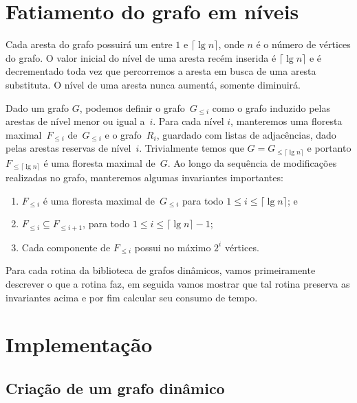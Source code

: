 \section{Fatiamento do grafo em níveis}
\label{sec:fatia-em-niveis}
Cada aresta do grafo possuirá um  entre $1$ e $\lceil \lg n \rceil$, onde $n$ é o número de vértices do grafo. O valor inicial do nível de uma aresta recém inserida é $\lceil \lg n \rceil$ e é decrementado toda vez que percorremos a aresta em busca de uma aresta substituta. O nível de uma aresta nunca aumentá, somente diminuirá. 

Dado um grafo $G$, podemos definir o grafo~$G_{\leqslant i}$ como o grafo induzido pelas arestas de nível menor ou igual a~$i$. Para cada nível $i$, manteremos uma floresta maximal~$F_{\leqslant i}$ de~$G_{\leqslant i}$ e o grafo~$R_i$, guardado com listas de adjacências, dado pelas arestas reservas de nível~$i$. Trivialmente temos que $G = G_{\leqslant \lceil \lg n \rceil}$ e portanto $F_{\leqslant \lceil \lg n \rceil}$ é uma floresta maximal de~$G$. Ao longo da sequência de modificações realizadas no grafo, manteremos algumas invariantes importantes:
\begin{enumerate}[label=(\roman*)]
    \item $F_{\leqslant i}$ é uma floresta maximal de~$G_{\leqslant i}$ para todo $1\leqslant i \leqslant \lceil \lg n \rceil$; e\label{invar:SF}
    \item $F_{\leqslant i}\subseteq F_{\leqslant i+1}$, para todo $1\leqslant i \leqslant \lceil \lg n \rceil-1$; \label{invar:contida}
    \item Cada componente de $F_{\leqslant i}$ possui no máximo $2^i$ vértices.\label{invar:tamanho}
\end{enumerate}

Para cada rotina da biblioteca de grafos dinâmicos, vamos primeiramente descrever o que a rotina faz, em seguida vamos mostrar que tal rotina preserva as invariantes acima e por fim calcular seu consumo de tempo.

\section{Implementação}
\subsection{Criação de um grafo dinâmico}

